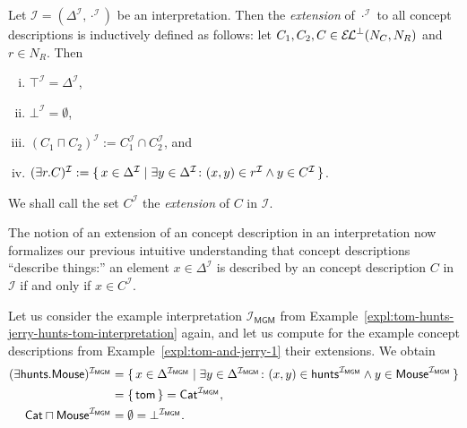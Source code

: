 \begin{Definition}[Extensions]
  \label{def:extending-the-interpretation-function}
  Let $\mathcal{I} = (\Delta^{\mathcal{I}}, \cdot^{\mathcal{I}})$ be an interpretation.
  Then the \emph{extension} of $\cdot^{\mathcal{I}}$ to all \ELbot concept descriptions is
  inductively defined as follows: let $C_1, C_2, C \in {\ensuremath{{\mathcal{E}\kern-.3ex\mathcal{L}}^\bot}}(N_C, N_R)$ and $r \in N_R$.
  Then
  \begin{enumerate}[i. ]
  \item $\top^{\mathcal{I}} = \Delta^{\mathcal{I}}$,
  \item $\bot^{\mathcal{I}} = \emptyset$,
  \item $(C_1 \sqcap C_2)^{\mathcal{I}} := C_1^{\mathcal{I}} \cap C_2^{\mathcal{I}}$, and
  \item $(\exists r. C)^{\mathcal{I}} := {\{\, x \in \Delta^{\mathcal{I}} \mid \exists y
      \in \Delta^{\mathcal{I}} \colon (x, y) \in r^{\mathcal{I}} \land y \in C^{\mathcal{I}} \,\}}$.
  \end{enumerate}
  We shall call the set $C^{\mathcal{I}}$ the \emph{extension} of $C$ in $\mathcal{I}$.
\end{Definition}

The notion of an extension of an \ELbot concept description in an interpretation now
formalizes our previous intuitive understanding that concept descriptions
\enquote{describe things:} an element $x \in \Delta^{\mathcal{I}}$ is described by an
\ELbot concept description $C$ in $\mathcal{I}$ if and only if $x \in C^{\mathcal{I}}$.

\begin{Example}
  \label{expl:tom-and-jerry-2}
  Let us consider the example interpretation $\mathcal{I}_{\mathsf{MGM}}$ from
  Example~\ref{expl:tom-hunts-jerry-hunts-tom-interpretation} again, and let us compute
  for the example \ELbot concept descriptions from Example~\ref{expl:tom-and-jerry-1}
  their extensions.  We obtain
  \begin{align*}
    (\mathsf{\exists hunts. Mouse})^{\mathcal{I}_{\mathsf{MGM}}} &= {\{\, x \in
      \Delta^{\mathcal{I}_{\mathsf{MGM}}} \mid \exists y \in
      \Delta^{\mathcal{I}_{\mathsf{MGM}}} \colon (x, y) \in
      \mathsf{hunts}^{\mathcal{I}_{\mathsf{MGM}}} \land y \in
      \mathsf{Mouse}^{\mathcal{I}_{\mathsf{MGM}}} \,\}}\\
    &= {\{\, \mathsf{tom} \,\}} = \mathsf{Cat}^{\mathcal{I}_{\mathsf{MGM}}},\\
    \mathsf{Cat \sqcap Mouse}^{\mathcal{I}_{\mathsf{MGM}}}
    &= \emptyset = \bot^{\mathcal{I}_{\mathsf{MGM}}}.
  \end{align*}
\end{Example}

